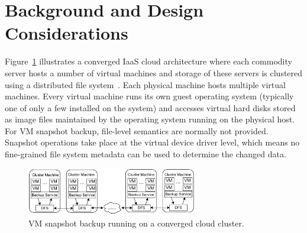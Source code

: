 \section{Background and Design Considerations}
\label{sect:background}

Figure~\ref{fig:collocated} illustrates a converged IaaS cloud architecture 
where
each commodity server hosts a number of virtual machines and storage of these servers
is clustered using a distributed file system~\cite{googlefs03,hdfs10}.
Each physical machine hosts multiple virtual machines.  Every virtual machine
runs its own guest operating system (typically one of only a few
installed on the system) and accesses virtual hard disks 
stored as image files maintained by the operating system running on the
physical host.
For VM snapshot backup, file-level semantics are normally not provided.
Snapshot operations take place at the virtual device driver level, which
means no fine-grained file system metadata can be used to determine the changed data. 





\begin{figure}[htb]
    \centering
    \includegraphics[width=3in]{images/colocated-arch}
    \caption{VM snapshot backup running on a converged cloud cluster.}
    \label{fig:collocated}
\end{figure}

